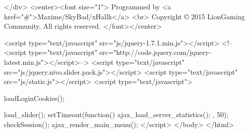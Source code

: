 </div>
<center><font size="1">
    Programmed by <a href="#">Maxime/SkyBad/xHallk</a> <br>
    Copyright © 2015 LionGaming Community. All rights reserved.
    </font></center>

<script type="text/javascript" src="js/jquery-1.7.1.min.js"></script>
<!--<script type="text/javascript" src="http://code.jquery.com/jquery-latest.min.js"></script>-->
<script type="text/javascript" src="js/jquery.nivo.slider.pack.js"></script>
<script type="text/javascript" src="js/static.js"></script>
<script type="text/javascript">

    loadLoginCookies();

    load_slider();
    setTimeout(function() {
        ajax_load_server_statistics();
    }, 50);
    checkSession();
    ajax_render_main_menu();
</script>
</body>
</html>